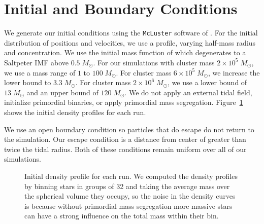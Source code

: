 \documentclass{princeton_astro_thesis}
\newcommand\Msun{\; M_\odot}
\numberwithin{equation}{section}
\begin{document}
\section{Initial and Boundary Conditions}
We generate our initial conditions using the \texttt{McLuster} software of \citet{2011Kupper}. For the initial distribution of positions and velocities, we use a \citet{1966King} profile, varying half-mass radius and concentration.  We use the initial mass function of \citet{2001Kroupa} which degenerates to a Saltpeter IMF above $0.5 \Msun$.  For our simulations with cluster mass $2 \times 10^5 \Msun$, we use a mass range of $1$ to $100 \Msun$.  For cluster mass $6 \times 10^5 \Msun$, we increase the lower bound to $3.3 \Msun$.  For cluster mass $2 \times 10^6 \Msun$, we use a lower bound of $13 \Msun$ and an upper bound of $120 \Msun$.  We do not apply an external tidal field, initialize primordial binaries, or apply primordial mass segregation. Figure~\ref{fig:icpanel} shows the initial density profiles for each run.

We use an open boundary condition so particles that do escape do not return to the simulation. Our escape condition is a distance from center of greater than twice the tidal radius. Both of these conditions remain uniform over all of our simulations.

\begin{figure}
\centering
{}
\caption{Initial density profile for each run.  We computed the density profiles by binning stars in groups of 32 and taking the average mass over the spherical volume they occupy, so the noise in the density curves is because without primordial mass segregation more massive stars can have a strong influence on the total mass within their bin.}
\label{fig:icpanel}
\end{figure}
\end{document}
